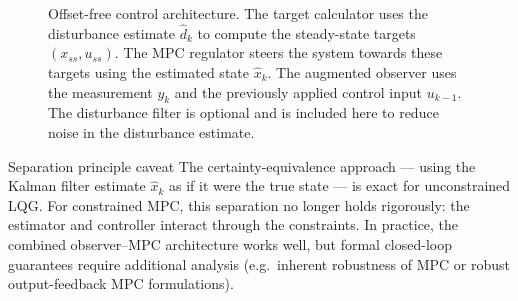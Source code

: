 \begin{figure}[htbp]
	\caption{Offset-free control architecture. The target calculator uses the  disturbance estimate \(\hat d_k\) to compute the steady-state targets \((x_{ss},u_{ss})\). The MPC regulator steers the system towards these targets using the estimated state \(\hat x_k\). The augmented observer uses the measurement \(y_k\) and the previously applied control input \(u_{k-1}\). The disturbance filter is optional and is included here to reduce noise in the disturbance estimate.}
	\label{fig:offset_free_architecture}
\end{figure}

\begin{notebox}{Separation principle caveat}
The certainty-equivalence approach --- using the Kalman filter estimate $\hat{x}_k$ as if it were the true state --- is exact for unconstrained LQG. For constrained MPC, this separation no longer holds rigorously: the estimator and controller interact through the constraints. In practice, the combined observer--MPC architecture works well, but formal closed-loop guarantees require additional analysis (e.g.\ inherent robustness of MPC or robust output-feedback MPC formulations).
\end{notebox}

